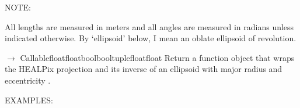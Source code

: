 \documentclass[a4paper,12ptopenany,oneside,english]{sphinxmanual}
\begin{document}
\sphinxAtStartPar
NOTE:

\sphinxAtStartPar
All lengths are measured in meters and all angles are measured in radians
unless indicated otherwise.
By ‘ellipsoid’ below, I mean an oblate ellipsoid of revolution.

\begin{fulllineitems}
\label{\detokenize{pj_healpix:rhealpixdggs.pj_healpix.healpix}}
\pysigstartsignatures
\pysiglinewithargsret
{}
{\sphinxparamcomma {}}
{{ $\rightarrow$ Callable\DUrole{p}{{[}}\DUrole{p}{{[}}floatfloatboolbool\DUrole{p}{{]}}tuple\DUrole{p}{{[}}floatfloat\DUrole{p}{{]}}\DUrole{p}{{]}}}}
\pysigstopsignatures
\sphinxAtStartPar
Return a function object that wraps the HEALPix projection and its inverse
of an ellipsoid with major radius  and eccentricity .

\sphinxAtStartPar
EXAMPLES:


\end{fulllineitems}
\end{document}
